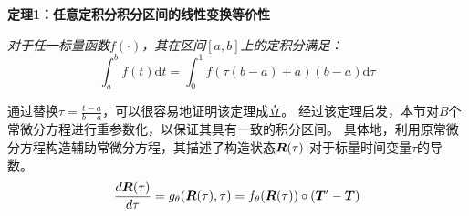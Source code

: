 \textbf{定理1：任意定积分积分区间的线性变换等价性}

\textit{对于任一标量函数$f(\cdot)$，其在区间$[a, b]$上的定积分满足：}
\begin{equation}
\int_{a}^{b}f(t) \text{d}t=\int_{0}^1f(\tau(b-a)+a) (b-a)\text{d}\tau
\end{equation}

通过替换$\tau = \frac{t-a}{b-a}$，可以很容易地证明该定理成立。
经过该定理启发，本节对$B$个常微分方程进行重参数化，以保证其具有一致的积分区间。
具体地，利用原常微分方程构造辅助常微分方程，其描述了构造状态$\boldsymbol{R}(\tau)$ 对于标量时间变量$\tau$的导数。
\begin{equation}
    \frac{d\boldsymbol R(\tau)}{d\tau}=g_{\theta}(\boldsymbol R(\tau), \tau)=f_\theta(\boldsymbol R(\tau))\circ (\boldsymbol{T}'-\boldsymbol{T})
\label{equ:construct_ode}
\end{equation}

